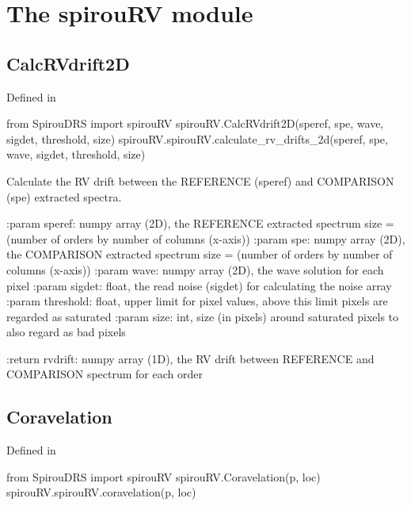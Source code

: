 
\clearpage
\newpage
\begin{minipage}{\textwidth}
\section{The spirouRV module}
\label{ch:the_module:spirouRV}

\subsection{CalcRVdrift2D}

Defined in \spirouRV{}

\begin{pythonbox}
from SpirouDRS import spirouRV
spirouRV.CalcRVdrift2D(speref, spe, wave, sigdet, threshold, size)
spirouRV.spirouRV.calculate_rv_drifts_2d(speref, spe, wave, sigdet, threshold, size)
\end{pythonbox}

\begin{pythondocstring}
Calculate the RV drift between the REFERENCE (speref) and COMPARISON (spe)
extracted spectra.

:param speref: numpy array (2D), the REFERENCE extracted spectrum
               size = (number of orders by number of columns (x-axis))
:param spe:  numpy array (2D), the COMPARISON extracted spectrum
             size = (number of orders by number of columns (x-axis))
:param wave: numpy array (2D), the wave solution for each pixel
:param sigdet: float, the read noise (sigdet) for calculating the
               noise array
:param threshold: float, upper limit for pixel values, above this limit
                  pixels are regarded as saturated
:param size: int, size (in pixels) around saturated pixels to also regard
             as bad pixels

:return rvdrift: numpy array (1D), the RV drift between REFERENCE and
                 COMPARISON spectrum for each order
\end{pythondocstring}
\end{minipage}

\begin{minipage}{\textwidth}
\subsection{Coravelation}

Defined in \spirouRV{}

\begin{pythonbox}
from SpirouDRS import spirouRV
spirouRV.Coravelation(p, loc)
spirouRV.spirouRV.coravelation(p, loc)
\end{pythonbox}

\begin{pythondocstring}

\end{pythondocstring}
\end{minipage}


